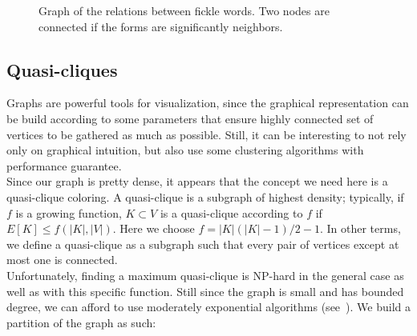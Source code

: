 \documentclass[preprint]{elsarticle}
\begin{document}
\begin{figure}[h!]

\caption{Graph of the relations between fickle words. Two nodes are connected if the forms are significantly neighbors.}
\label{fig:graph1}
\end{figure}

\subsection{Quasi-cliques}

Graphs are powerful tools for visualization, since the graphical representation can be build according to some parameters that ensure highly connected set of vertices to be gathered as much as possible. Still, it can be interesting to not rely only on graphical intuition, but also use some clustering algorithms with performance guarantee.\\

Since our graph is pretty dense, it appears that the concept we need here is a quasi-clique coloring. A quasi-clique is a subgraph of highest density; typically, if $f$ is a growing function, $K \subset V$ is a quasi-clique according to $f$ if $E[K] \leq f(|K|,|V|)$. Here we choose $f=|K|(|K|-1)/2-1$. In other terms, we define a quasi-clique as a subgraph such that every pair of vertices except at most one is connected.\\

Unfortunately, finding a maximum quasi-clique is NP-hard in the general case as well as with this specific function. Still since the graph is small and has bounded degree, we can afford to use moderately exponential algorithms (see~\cite{qis}). We build a partition of the graph as such:\\
\end{document}
